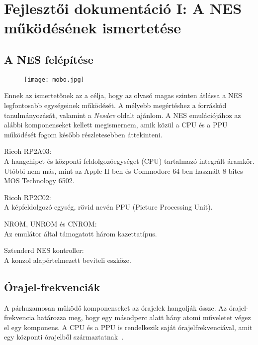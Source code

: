 \chapter{Fejlesztői dokumentáció I: A NES működésének ismertetése} %
\label{ch:impl}

\section{A NES felépítése}

\begin{figure}[H]
	\centering
	\texttt{[image: mobo.jpg]}
\end{figure}

Ennek az ismertetőnek az a célja, hogy az olvasó magas szinten átlássa a NES legfontosabb egységeinek működését. A mélyebb megértéshez a forráskód tanulmányozását, valamint a \emph{Nesdev}\cite{ref} oldalt ajánlom.
A NES emulációjához az alábbi komponenseket kellett megismernem, amik közül a CPU és a PPU működését fogom később részletesebben áttekinteni.

\begin{compactdesc}
	\item[Ricoh RP2A03:] 
	\hfill \\
	A hangchipet és központi feldolgozóegységet (CPU) tartalmazó integrált áramkör. Utóbbi nem más, mint az Apple II-ben és Commodore 64-ben használt 8-bites MOS Technology 6502.
	\item[Ricoh RP2C02:]
	\hfill \\
	A képfeldolgozó egység, rövid nevén PPU (Picture Processing Unit).
	\item[NROM\cite{nromref}, UNROM\cite{unromref} és CNROM\cite{cnromref}:] 
	\hfill \\
	Az emulátor által támogatott három kazettatípus.
	\item[Sztenderd NES kontroller\cite{control}:]
	\hfill \\
	A konzol alapértelmezett beviteli eszköze.
\end{compactdesc}

\section{Órajel-frekvenciák}
A párhuzamosan működő komponenseket az órajelek hangolják össze. Az órajel-frekvencia határozza meg, hogy egy másodperc alatt hány atomi műveletet végez el egy komponens.
A CPU és a PPU is rendelkezik saját órajelfrekvenciával, amit egy központi órajelből származtatnak~\cite{nesclocks}.

